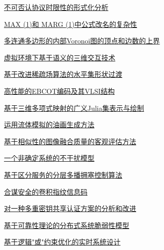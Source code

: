 \documentclass[a4paper]{article}
\begin{document}
\href{http://www.jos.org.cn/ch/reader/download_pdf.aspx?file_no=20060704&year_id=2006&quarter_id=7&falg=1}{不可否认协议时限性的形式化分析}

\href{http://www.jos.org.cn/ch/reader/download_pdf.aspx?file_no=20060705&year_id=2006&quarter_id=7&falg=1}{MAX (1)和 MARG (1)中公式改名的复杂性}

\href{http://www.jos.org.cn/ch/reader/download_pdf.aspx?file_no=20060706&year_id=2006&quarter_id=7&falg=1}{多连通多边形的内部Voronoi图的顶点和边数的上界}

\href{http://www.jos.org.cn/ch/reader/download_pdf.aspx?file_no=20060707&year_id=2006&quarter_id=7&falg=1}{虚拟环境下基于语义的三维交互技术}

\href{http://www.jos.org.cn/ch/reader/download_pdf.aspx?file_no=20060708&year_id=2006&quarter_id=7&falg=1}{基于改进稀疏场算法的水平集形状过渡}

\href{http://www.jos.org.cn/ch/reader/download_pdf.aspx?file_no=20060709&year_id=2006&quarter_id=7&falg=1}{高性能的EBCOT编码及其VLSI结构}

\href{http://www.jos.org.cn/ch/reader/download_pdf.aspx?file_no=20060710&year_id=2006&quarter_id=7&falg=1}{基于三维多项式映射的广义Julia集表示与绘制}

\href{http://www.jos.org.cn/ch/reader/download_pdf.aspx?file_no=20060711&year_id=2006&quarter_id=7&falg=1}{运用流体模拟的油画生成方法}

\href{http://www.jos.org.cn/ch/reader/download_pdf.aspx?file_no=20060712&year_id=2006&quarter_id=7&falg=1}{基于相似性的图像融合质量的客观评估方法}

\href{http://www.jos.org.cn/ch/reader/download_pdf.aspx?file_no=20060714&year_id=2006&quarter_id=7&falg=1}{一个非确定系统的不干扰模型}

\href{http://www.jos.org.cn/ch/reader/download_pdf.aspx?file_no=20060715&year_id=2006&quarter_id=7&falg=1}{基于区分服务的分层多播拥塞控制算法}

\href{http://www.jos.org.cn/ch/reader/download_pdf.aspx?file_no=20060716&year_id=2006&quarter_id=7&falg=1}{合谋安全的卷积指纹信息码}

\href{http://www.jos.org.cn/ch/reader/download_pdf.aspx?file_no=20060717&year_id=2006&quarter_id=7&falg=1}{对一种多重密钥共享认证方案的分析和改进}

\href{http://www.jos.org.cn/ch/reader/download_pdf.aspx?file_no=20060718&year_id=2006&quarter_id=7&falg=1}{基于可靠性理论的分布式系统脆弱性模型}

\href{http://www.jos.org.cn/ch/reader/download_pdf.aspx?file_no=20060719&year_id=2006&quarter_id=7&falg=1}{基于逻辑"或"约束优化的实时系统设计}
\end{document}
